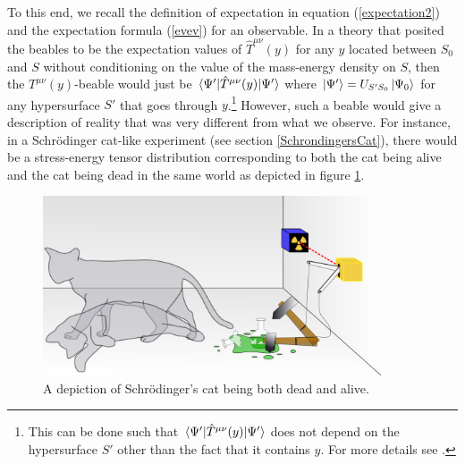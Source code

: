 To this end, we recall the definition of expectation in equation (\ref{expectation2}) and the expectation formula (\ref{evev}) for an observable. In a theory that posited the beables to be the expectation values of $\hat{T}^{\mu\nu}(y)$ for any $y$ located between $S_0$ and $S$  without conditioning on the value of the mass-energy density on $S$, then the $T^{\mu\nu}(y)$-beable would just be $\ev*{\hat{T}^{\mu\nu}(y)}{\Psi'}$ where $\ket{\Psi'}=U_{S'S_0}\ket{\Psi_0}$ for any hypersurface $S'$ that goes through $y$.\footnote{This can be done such that $\ev*{\hat{T}^{\mu\nu}(y)}{\Psi'}$ does not depend on the hypersurface $S'$ other than the fact that it contains $y$. For more details see \cite{SchwingerJulianI}.} However, such a beable would give a description of reality that was very different from what we observe. For instance, in a Schr\"{o}dinger cat-like experiment (see section \ref{SchrondingersCat}), there would be a stress-energy tensor distribution corresponding to both the cat being alive and the cat being dead in the same world as depicted in figure \ref{deadlivecat}.
\begin{figure}[ht!]
  \captionsetup{justification=justified}
  \centering
  \includegraphics[width=100mm]{Chapter03/Schrodingers_cat.png}
  \caption[Caption for LOF]{A depiction of Schr\"{o}dinger's cat being both dead and alive.\protect\footnotemark}
  \label{deadlivecat}
  \end{figure}
